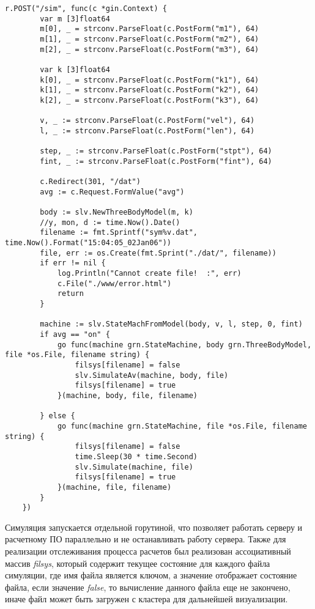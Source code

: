 \begin{lstlisting}[numbers=none, language=Golang,caption=Реализация обработчика POST запроса, label=lst:post]
    r.POST("/sim", func(c *gin.Context) {
		var m [3]float64
		m[0], _ = strconv.ParseFloat(c.PostForm("m1"), 64)
		m[1], _ = strconv.ParseFloat(c.PostForm("m2"), 64)
		m[2], _ = strconv.ParseFloat(c.PostForm("m3"), 64)

		var k [3]float64
		k[0], _ = strconv.ParseFloat(c.PostForm("k1"), 64)
		k[1], _ = strconv.ParseFloat(c.PostForm("k2"), 64)
		k[2], _ = strconv.ParseFloat(c.PostForm("k3"), 64)

		v, _ := strconv.ParseFloat(c.PostForm("vel"), 64)
		l, _ := strconv.ParseFloat(c.PostForm("len"), 64)

		step, _ := strconv.ParseFloat(c.PostForm("stpt"), 64)
		fint, _ := strconv.ParseFloat(c.PostForm("fint"), 64)

		c.Redirect(301, "/dat")
		avg := c.Request.FormValue("avg")

		body := slv.NewThreeBodyModel(m, k)
		//y, mon, d := time.Now().Date()
		filename := fmt.Sprintf("sym%v.dat", time.Now().Format("15:04:05_02Jan06"))
		file, err := os.Create(fmt.Sprint("./dat/", filename))
		if err != nil {
			log.Println("Cannot create file!  :", err)
			c.File("./www/error.html")
			return
		}

		machine := slv.StateMachFromModel(body, v, l, step, 0, fint)
		if avg == "on" {
			go func(machine grn.StateMachine, body grn.ThreeBodyModel, file *os.File, filename string) {
				filsys[filename] = false
				slv.SimulateAv(machine, body, file)
				filsys[filename] = true
			}(machine, body, file, filename)

		} else {
			go func(machine grn.StateMachine, file *os.File, filename string) {
				filsys[filename] = false
				time.Sleep(30 * time.Second)
				slv.Simulate(machine, file)
				filsys[filename] = true
			}(machine, file, filename)
		}
	})
\end{lstlisting}

Симуляция запускается отдельной горутиной, что позволяет работать серверу и расчетному ПО параллельно и не останавливать работу сервера. Также для реализации 
отслеживания процесса расчетов был реализован ассоциативный массив \textit{filsys}, который содержит текущее состояние для каждого файла симуляции, где имя файла является ключом, 
а значение отображает состояние файла, если значение \textit{false}, то вычисление данного файла еще не закончено, иначе файл может быть загружен с кластера для дальнейшей 
визуализации.

